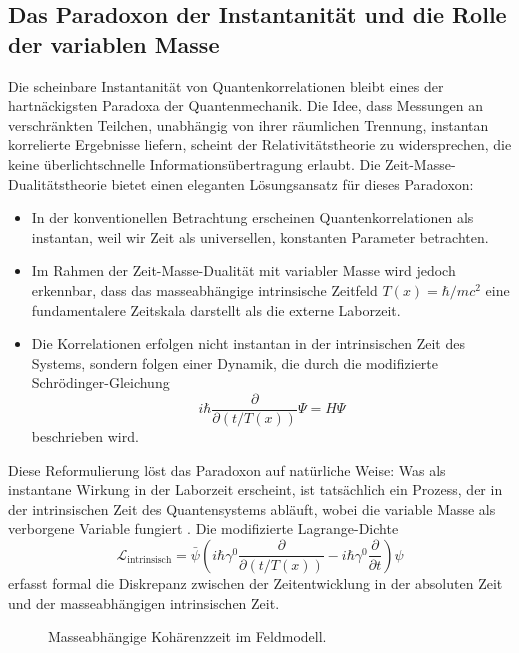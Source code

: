 \documentclass[12pt,a4paper]{article}
\newcommand{\Tfield}{T(x)}
\begin{document}
	\subsection{Das Paradoxon der Instantanität und die Rolle der variablen Masse}
	Die scheinbare Instantanität von Quantenkorrelationen bleibt eines der hartnäckigsten Paradoxa der Quantenmechanik. Die Idee, dass Messungen an verschränkten Teilchen, unabhängig von ihrer räumlichen Trennung, instantan korrelierte Ergebnisse liefern, scheint der Relativitätstheorie zu widersprechen, die keine überlichtschnelle Informationsübertragung erlaubt.
	Die Zeit-Masse-Dualitätstheorie bietet einen eleganten Lösungsansatz für dieses Paradoxon:
	\begin{itemize}
		\item In der konventionellen Betrachtung erscheinen Quantenkorrelationen als instantan, weil wir Zeit als universellen, konstanten Parameter betrachten.
		\item Im Rahmen der Zeit-Masse-Dualität mit variabler Masse wird jedoch erkennbar, dass das masseabhängige intrinsische Zeitfeld \(\Tfield = \hbar/mc^2\) eine fundamentalere Zeitskala darstellt als die externe Laborzeit.
		\item Die Korrelationen erfolgen nicht instantan in der intrinsischen Zeit des Systems, sondern folgen einer Dynamik, die durch die modifizierte Schrödinger-Gleichung
		\begin{equation}
			i\hbar \frac{\partial}{\partial (t/\Tfield)}\Psi = \hat{H}\Psi
		\end{equation}
		beschrieben wird.
	\end{itemize}
	Diese Reformulierung löst das Paradoxon auf natürliche Weise: Was als instantane Wirkung in der Laborzeit erscheint, ist tatsächlich ein Prozess, der in der intrinsischen Zeit des Quantensystems abläuft, wobei die variable Masse als verborgene Variable fungiert \cite{Pascher2024}. Die modifizierte Lagrange-Dichte
	\begin{equation}
		\mathcal{L}_\text{intrinsisch} = \bar{\psi}\left(i\hbar\gamma^0 \frac{\partial}{\partial (t/\Tfield)} - i\hbar\gamma^0 \frac{\partial}{\partial t}\right)\psi
	\end{equation}
	erfasst formal die Diskrepanz zwischen der Zeitentwicklung in der absoluten Zeit und der masseabhängigen intrinsischen Zeit.
	
	\begin{figure}[h]
		\centering
		\caption{Masseabhängige Kohärenzzeit im Feldmodell.}
	\end{figure}
	
\end{document}

